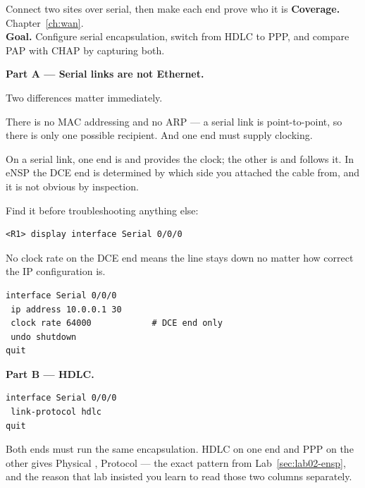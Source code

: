 
\begin{labproject}{Connect two sites over serial, then make each end prove who it is}
\textbf{Coverage.} Chapter~\ref{ch:wan}.\\
\textbf{Goal.} Configure serial encapsulation, switch from HDLC to PPP, and compare PAP with CHAP by capturing both.

\medskip\noindent\textbf{Part A --- Serial links are not Ethernet.}\par
Two differences matter immediately.

There is no MAC addressing and no ARP --- a serial link is point-to-point, so there is only one possible recipient. And one end must supply clocking.

\begin{keyidea}
On a serial link, one end is  and provides the clock; the other is  and follows it. In eNSP the DCE end is determined by which side you attached the cable from, and it is not obvious by inspection.

Find it before troubleshooting anything else:

\begin{lstlisting}[style=dcnterminal]
<R1> display interface Serial 0/0/0
\end{lstlisting}

No clock rate on the DCE end means the line stays down no matter how correct the IP configuration is.
\end{keyidea}

\begin{lstlisting}[style=dcnterminal]
interface Serial 0/0/0
 ip address 10.0.0.1 30
 clock rate 64000            # DCE end only
 undo shutdown
quit
\end{lstlisting}

\medskip\noindent\textbf{Part B --- HDLC.}\par

\begin{lstlisting}[style=dcnterminal]
interface Serial 0/0/0
 link-protocol hdlc
quit
\end{lstlisting}

\begin{pitfall}
Both ends must run the same encapsulation. HDLC on one end and PPP on the other gives Physical , Protocol  --- the exact pattern from Lab~\ref{sec:lab02-ensp}, and the reason that lab insisted you learn to read those two columns separately.


\end{pitfall}
\end{labproject}
